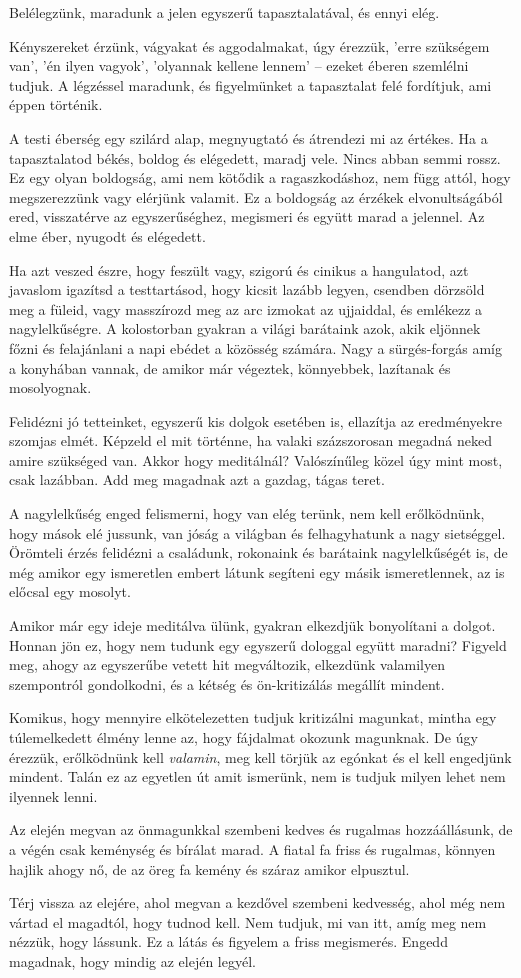 Belélegzünk, maradunk a jelen egyszerű tapasztalatával, és ennyi elég.

Kényszereket érzünk, vágyakat és aggodalmakat, úgy érezzük, 'erre
szükségem van', 'én ilyen vagyok', 'olyannak kellene lennem' -- ezeket
éberen szemlélni tudjuk. A légzéssel maradunk, és figyelmünket a
tapasztalat felé fordítjuk, ami éppen történik.

A testi éberség egy szilárd alap, megnyugtató és átrendezi mi az
értékes. Ha a tapasztalatod békés, boldog és elégedett, maradj vele.
Nincs abban semmi rossz. Ez egy olyan boldogság, ami nem kötődik a
ragaszkodáshoz, nem függ attól, hogy megszerezzünk vagy elérjünk
valamit. Ez a boldogság az érzékek elvonultságából ered, visszatérve az
egyszerűséghez, megismeri és együtt marad a jelennel. Az elme éber,
nyugodt és elégedett.

Ha azt veszed észre, hogy feszült vagy, szigorú és cinikus a hangulatod,
azt javaslom igazítsd a testtartásod, hogy kicsit lazább legyen,
csendben dörzsöld meg a füleid, vagy masszírozd meg az arc izmokat az
ujjaiddal, és emlékezz a nagylelkűségre. A kolostorban gyakran a világi
barátaink azok, akik eljönnek főzni és felajánlani a napi ebédet a
közösség számára. Nagy a sürgés-forgás amíg a konyhában vannak, de
amikor már végeztek, könnyebbek, lazítanak és mosolyognak.

Felidézni jó tetteinket, egyszerű kis dolgok esetében is, ellazítja az
eredményekre szomjas elmét. Képzeld el mit történne, ha valaki
százszorosan megadná neked amire szükséged van. Akkor hogy meditálnál?
Valószínűleg közel úgy mint most, csak lazábban. Add meg magadnak azt a
gazdag, tágas teret.

A nagylelkűség enged felismerni, hogy van elég terünk, nem kell
erőlködnünk, hogy mások elé jussunk, van jóság a világban és
felhagyhatunk a nagy sietséggel. Örömteli érzés felidézni a családunk,
rokonaink és barátaink nagylelkűségét is, de még amikor egy ismeretlen
embert látunk segíteni egy másik ismeretlennek, az is előcsal egy
mosolyt.

Amikor már egy ideje meditálva ülünk, gyakran elkezdjük bonyolítani a
dolgot. Honnan jön ez, hogy nem tudunk egy egyszerű dologgal együtt
maradni? Figyeld meg, ahogy az egyszerűbe vetett hit megváltozik,
elkezdünk valamilyen szempontról gondolkodni, és a kétség és
ön-kritizálás megállít mindent.

Komikus, hogy mennyire elkötelezetten tudjuk kritizálni magunkat, mintha
egy túlemelkedett élmény lenne az, hogy fájdalmat okozunk magunknak. De
úgy érezzük, erőlködnünk kell \emph{valamin}, meg kell törjük az egónkat
és el kell engedjünk mindent. Talán ez az egyetlen út amit ismerünk, nem
is tudjuk milyen lehet nem ilyennek lenni.

Az elején megvan az önmagunkkal szembeni kedves és rugalmas
hozzáállásunk, de a végén csak keménység és bírálat marad. A fiatal fa
friss és rugalmas, könnyen hajlik ahogy nő, de az öreg fa kemény és
száraz amikor elpusztul.

Térj vissza az elejére, ahol megvan a kezdővel szembeni kedvesség, ahol
még nem vártad el magadtól, hogy tudnod kell. Nem tudjuk, mi van itt,
amíg meg nem nézzük, hogy lássunk. Ez a látás és figyelem a friss
megismerés. Engedd magadnak, hogy mindig az elején legyél.
